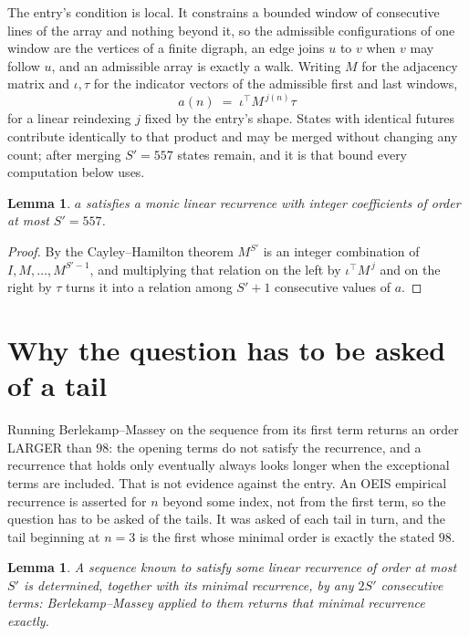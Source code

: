 \documentclass[11pt,a4paper]{article}
\theoremstyle{plain}
\newtheorem{lemma}[theorem]{Lemma}
\theoremstyle{definition}
\begin{document}
The entry's condition is local. It constrains a bounded window of consecutive lines of the
array and nothing beyond it, so the admissible configurations of one window are the vertices of
a finite digraph, an edge joins $u$ to $v$ when $v$ may follow $u$, and an admissible array is
exactly a walk. Writing $M$ for the adjacency matrix and $\iota,\tau$ for the indicator vectors
of the admissible first and last windows,
\[
a(n)\;=\;\iota^{\!\top}M^{\,j(n)}\tau
\]
for a linear reindexing $j$ fixed by the entry's shape. States with identical futures
contribute identically to that product and may be merged without changing any count; after
merging $S'=557$ states remain, and it is that bound every computation below uses.

\begin{lemma}\label{lem:cf}
$a$ satisfies a monic linear recurrence with integer coefficients of order at most $S'=557$.
\end{lemma}

\begin{proof}
By the Cayley--Hamilton theorem $M^{S'}$ is an integer combination of $I,M,\dots,M^{S'-1}$,
and multiplying that relation on the left by $\iota^{\!\top}M^{\,j}$ and on the right by
$\tau$ turns it into a relation among $S'+1$ consecutive values of $a$.
\end{proof}

\section{Why the question has to be asked of a tail}

Running Berlekamp--Massey on the sequence from its first term returns an order LARGER than $98$: the opening terms do not satisfy the recurrence, and a recurrence that holds only eventually always looks longer when the exceptional terms are included. That is not evidence against the entry. An OEIS empirical recurrence is asserted for $n$ beyond some index, not from the first term, so the question has to be asked of the tails. It was asked of each tail in turn, and the tail beginning at $n=3$ is the first whose minimal order is exactly the stated $98$.

\begin{lemma}\label{lem:bm}
A sequence known to satisfy some linear recurrence of order at most $S'$ is determined,
together with its minimal recurrence, by any $2S'$ consecutive terms: Berlekamp--Massey applied
to them returns that minimal recurrence exactly.
\end{lemma}
\end{document}
